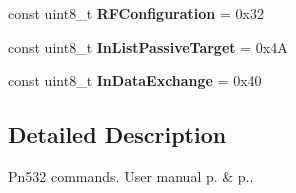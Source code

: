 \begin{DoxyCompactItemize}
\item 
\mbox{\label{namespacenfc_1_1pn532_1_1command_a35a1e049e7ede04c3333e8ca4ea850fa}} 
const uint8\+\_\+t {\bfseries R\+F\+Configuration} = 0x32
\item 
\mbox{\label{namespacenfc_1_1pn532_1_1command_a277b57192cfa053471a7245a5d612abc}} 
const uint8\+\_\+t {\bfseries In\+List\+Passive\+Target} = 0x4A
\item 
\mbox{\label{namespacenfc_1_1pn532_1_1command_aed733a6e58c28c5efca87874056f21f0}} 
const uint8\+\_\+t {\bfseries In\+Data\+Exchange} = 0x40
\end{DoxyCompactItemize}


\subsection{Detailed Description}
Pn532 commands. User manual p. \& p.. 